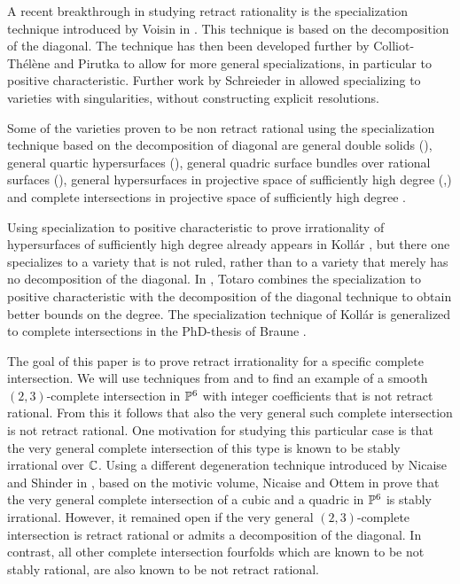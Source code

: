 A recent breakthrough in studying retract rationality is the specialization technique introduced by Voisin in \cite{VoisinDoubleQuartic}. This technique is based on the decomposition of the diagonal. The technique has then been developed further by Colliot-Thélène and Pirutka \cite{ColliotThelenePirutka} to allow for more general specializations, in particular to positive characteristic. Further work by Schreieder in \cite{SchreiederQuadric} allowed specializing to varieties with singularities, without constructing explicit resolutions.

Some of the varieties proven to be non retract rational using the specialization technique based on the decomposition of diagonal are general double solids (\cite{VoisinDoubleQuartic}), general quartic hypersurfaces (\cite{ColliotThelenePirutka}), general quadric surface bundles over rational surfaces (\cite{HPTActa}), general hypersurfaces in projective space of sufficiently high degree (\cite{Tot16},\cite{SchreiederHypersurface}) and  complete intersections in projective space of sufficiently high degree \cite{ChatzistamatiouLevine}.

Using specialization to positive characteristic to prove irrationality of hypersurfaces of sufficiently high degree already appears in Koll\'ar \cite{KollarHypersurfaces}, but there one specializes to a variety that is not ruled, rather than to a variety that merely has no decomposition of the diagonal. In \cite{Tot16}, Totaro combines the specialization to positive characteristic with the decomposition of the diagonal technique to obtain better bounds on the degree. The specialization technique of Koll\'ar is generalized to complete intersections in the PhD-thesis of Braune \cite{BraunePhD}.

The goal of this paper is to prove retract irrationality for a specific complete intersection. We will use techniques from \cite{SchreiederQuadric} and \cite{SchreiederHypersurface} to find an example of a smooth $(2,3)$-complete intersection in $\P^6$ with integer coefficients that is not retract rational. From this it follows that also the very general such complete intersection is not retract rational. One motivation for studying this particular case is that the very general complete intersection of this type is known to be stably irrational over $\C$. Using a different degeneration technique introduced by Nicaise and Shinder in \cite{NicaiseShinderMotivic}, based on the motivic volume, Nicaise and Ottem in \cite{NicaiseOttem} prove that the very general complete intersection of a cubic and a quadric in $\P^6$ is stably irrational. However, it remained open if the very general $(2,3)$-complete intersection is retract rational or admits a decomposition of the diagonal. In contrast, all other complete intersection fourfolds which are known to be not stably rational, are also known to be not retract rational.

